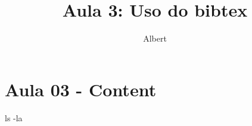 \documentclass[a4paper]{article}
\author{Albert}
\title{Aula 3: Uso do bibtex}
\begin{document}

\section*{Aula 03 - Content}


\newcommand{\aliasl}{ls -la}
\aliasl



\end{document}
